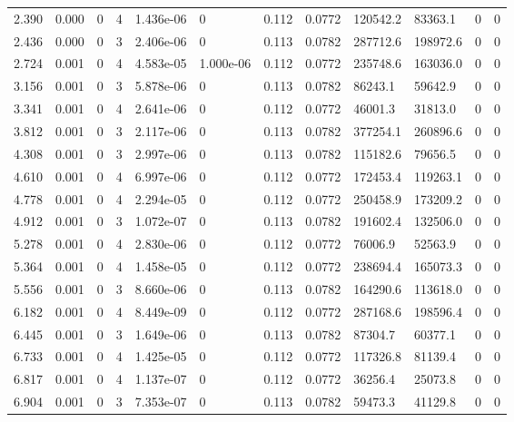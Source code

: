 \documentclass[preview]{standalone}
\begin{document}
{{\begin{tabular}{L{1.2cm}C{1.2cm} C{0.3cm}C{0.5cm} C{1.4cm}C{1.4cm} C{1.4cm}C{1.4cm} C{1.6cm}C{1.6cm} C{1.6cm}C{1.6cm}}
  2.390  &  0.000  & 0     &  4 &  1.436e-06  & 0  &  0.112&   0.0772& 120542.2 & 83363.1   &  0 & 0  \\ 
  2.436  &  0.000  & 0     &  3 &  2.406e-06  & 0  &  0.113&   0.0782& 287712.6 & 198972.6   &  0 & 0  \\ 
  2.724  &  0.001  & 0     &  4 &  4.583e-05  & 1.000e-06  &  0.112&   0.0772& 235748.6 & 163036.0   &  0 & 0  \\ 
  3.156  &  0.001  & 0     &  3 &  5.878e-06  & 0  &  0.113&   0.0782& 86243.1 & 59642.9   &  0 & 0  \\ 
  3.341  &  0.001  & 0     &  4 &  2.641e-06  & 0  &  0.112&   0.0772& 46001.3 & 31813.0   &  0 & 0  \\ 
  3.812  &  0.001  & 0     &  3 &  2.117e-06  & 0  &  0.113&   0.0782& 377254.1 & 260896.6   &  0 & 0  \\ 
  4.308  &  0.001  & 0     &  3 &  2.997e-06  & 0  &  0.113&   0.0782& 115182.6 & 79656.5   &  0 & 0  \\ 
  4.610  &  0.001  & 0     &  4 &  6.997e-06  & 0  &  0.112&   0.0772& 172453.4 & 119263.1   &  0 & 0  \\ 
  4.778  &  0.001  & 0     &  4 &  2.294e-05  & 0  &  0.112&   0.0772& 250458.9 & 173209.2   &  0 & 0  \\ 
  4.912  &  0.001  & 0     &  3 &  1.072e-07  & 0  &  0.113&   0.0782& 191602.4 & 132506.0   &  0 & 0  \\ 
  5.278  &  0.001  & 0     &  4 &  2.830e-06  & 0  &  0.112&   0.0772& 76006.9 & 52563.9   &  0 & 0  \\ 
  5.364  &  0.001  & 0     &  4 &  1.458e-05  & 0  &  0.112&   0.0772& 238694.4 & 165073.3   &  0 & 0  \\ 
  5.556  &  0.001  & 0     &  3 &  8.660e-06  & 0  &  0.113&   0.0782& 164290.6 & 113618.0   &  0 & 0  \\ 
  6.182  &  0.001  & 0     &  4 &  8.449e-09  & 0  &  0.112&   0.0772& 287168.6 & 198596.4   &  0 & 0  \\ 
  6.445  &  0.001  & 0     &  3 &  1.649e-06  & 0  &  0.113&   0.0782& 87304.7 & 60377.1   &  0 & 0  \\ 
  6.733  &  0.001  & 0     &  4 &  1.425e-05  & 0  &  0.112&   0.0772& 117326.8 & 81139.4   &  0 & 0  \\ 
  6.817  &  0.001  & 0     &  4 &  1.137e-07  & 0  &  0.112&   0.0772& 36256.4 & 25073.8   &  0 & 0  \\ 
  6.904  &  0.001  & 0     &  3 &  7.353e-07  & 0  &  0.113&   0.0782& 59473.3 & 41129.8   &  0 & 0  \\ 

\end{tabular}}}
\end{document}
